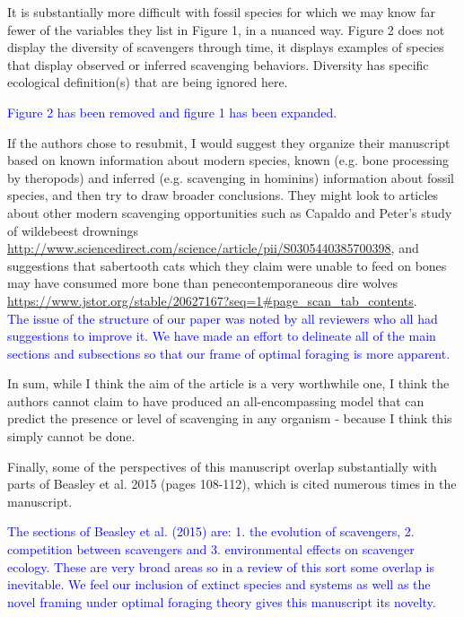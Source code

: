 \documentclass[12pt,letterpaper]{article}
\begin{document}
It is substantially more difficult with fossil species for which we may know far fewer of the variables they list in Figure 1, in a nuanced way.
Figure 2 does not display the diversity of scavengers through time, it displays examples of species that display observed or inferred scavenging behaviors.
Diversity has specific ecological definition(s) that are being ignored here.

\textcolor{blue}{Figure 2 has been removed and figure 1 has been expanded.}


If the authors chose to resubmit, I would suggest they organize their manuscript based on known information about modern species, known (e.g. bone processing by theropods) and inferred (e.g. scavenging in hominins) information about fossil species, and then try to draw broader conclusions.
They might look to articles about other modern scavenging opportunities such as Capaldo and Peter's study of wildebeest drownings \url{http://www.sciencedirect.com/science/article/pii/S0305440385700398}, and suggestions that sabertooth cats which they claim were unable to feed on bones may have consumed more bone than penecontemporaneous dire wolves \url{https://www.jstor.org/stable/20627167?seq=1#page_scan_tab_contents}. \\
\smallskip
\textcolor{blue}{The issue of the structure of our paper was noted by all reviewers who all had suggestions to improve it. 
We have made an effort to delineate all of the main sections and subsections so that our frame of optimal foraging is more apparent.}

\smallskip
In sum, while I think the aim of the article is a very worthwhile one, I think the authors cannot claim to have produced an all-encompassing model that can predict the presence or level of scavenging in any organism - because I think this simply cannot be done.


Finally, some of the perspectives of this manuscript overlap substantially with parts of Beasley et al. 2015 (pages 108-112), which is cited numerous times in the manuscript.
\smallskip

\textcolor{blue}{The sections of Beasley et al. (2015) are: 1. the evolution of scavengers, 2. competition between scavengers and 3. environmental effects on scavenger ecology.
These are very broad areas so in a review of this sort some overlap is inevitable.
We feel our inclusion of extinct species and systems as well as the novel framing under optimal foraging theory gives this manuscript its novelty.} 
\smallskip
\end{document}
